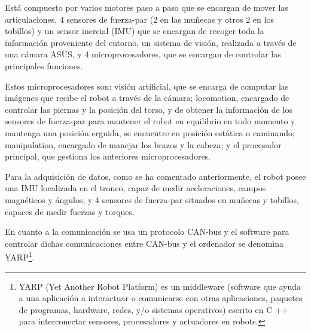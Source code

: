 
Está compuesto por varios motores paso a paso que se encargan de mover las articulaciones, 4 sensores de fuerza-par (2 en las muñecas y otros 2 en los tobillos) y un sensor inercial (IMU) que se encargan de recoger toda la información proveniente del entorno, un sistema de visión, realizada a través de una cámara ASUS, y 4 microprocesadores, que se encargan de controlar las principales funciones.

Estos microprocesadores son: visión artificial, que se encarga de computar las imágenes que recibe el robot a través de la cámara; locomotion, encargado de controlar las piernas y la posición del torso, y de obtener la información de los sensores de fuerza-par para mantener el robot en equilibrio en todo momento y mantenga una posición erguida, se encuentre en posición estática o caminando; manipulation, encargado de manejar los brazos y la cabeza; y el procesador principal, que gestiona los anteriores microprocesadores. 

Para la adquisición de datos, como se ha comentado anteriormente, el robot posee una IMU localizada en el tronco, capaz de medir aceleraciones, campos magnéticos y ángulos,  y 4 sensores de fuerza-par situados en muñecas y tobillos, capaces de medir fuerzas y torques.

En cuanto a la comunicación se usa un protocolo CAN-bus y el software para controlar dichas comunicaciones entre CAN-bus y el ordenador se denomina YARP\footnote{YARP (Yet Another Robot Platform) es un middleware (software que ayuda a una aplicación a interactuar o comunicarse con otras aplicaciones, paquetes de programas, hardware, redes, y/o sistemas operativos) escrito en C ++ para interconectar sensores, procesadores y actuadores en robots.}.

